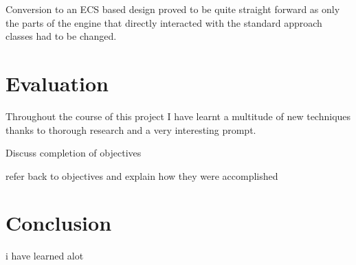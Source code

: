 \documentclass[11pt,a4paper,titlepage]{article}
\begin{document}




    Conversion to an ECS based design proved to be quite straight forward as only the parts of the engine that directly interacted with the standard approach classes had to be changed.





















\section{Evaluation}







    
    Throughout the course of this project I have learnt a multitude of new techniques thanks to thorough research and a very interesting prompt.

    Discuss completion of objectives

    refer back to objectives and explain how they were accomplished












\section{Conclusion}

    i have learned alot

	\newpage

	\printbibliography{}
\end{document}
